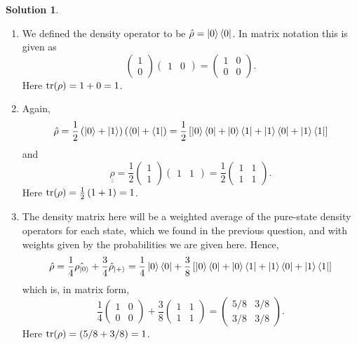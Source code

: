 \documentclass[10pt]{article}
\theoremstyle{definition}
\newtheorem{soln}{Solution}
\newcommand{\dul}[1]{\underline{\underline{#1}}}
\begin{document}
\begin{soln}~
  \begin{enumerate}[label=(\alph*)]
    \item We defined the density operator to be $\hat{\rho}=\ket{0}\bra{0}$. In matrix notation this is given as
          $$\begin{pmatrix}
              1 \\0
            \end{pmatrix}\begin{pmatrix}
              1 & 0
            \end{pmatrix}=\begin{pmatrix}
              1 & 0 \\
              0 & 0
            \end{pmatrix}.$$
          Here $\tr(\rho)=1+0=1$.
    \item Again,
          $$\hat{\rho}=\frac{1}{2}\left(\ket{0}+\ket{1}\right)\left(\bra{0}+\bra{1}\right)
            =\frac{1}{2}\left[\ket{0}\bra{0}+\ket{0}\bra{1}+\ket{1}\bra{0}+\ket{1}\bra{1}\right]
          $$ and
          $$
            \dul{\rho}=\frac{1}{2}\begin{pmatrix}
              1 \\1
            \end{pmatrix}\begin{pmatrix}
              1 & 1
            \end{pmatrix}
            =\frac{1}{2}\begin{pmatrix}
              1 & 1 \\
              1 & 1
            \end{pmatrix}.
          $$
          Here $\tr(\rho)=\frac{1}{2}\left(1+1\right)=1$.
    \item The density matrix here will be a weighted average of the pure-state density operators for each state, which we found in the previous question, and with
          weights given by the probabilities we are given here. Hence,
          $$\hat{\rho}=\frac{1}{4}\hat{\rho_{\ket{0}}}+\frac{3}{4}\hat{\rho}_{\ket{+}}
            =\frac{1}{4}\ket{0}\bra{0}+\frac{3}{8}\left[\ket{0}\bra{0}+\ket{0}\bra{1}+\ket{1}\bra{0}+\ket{1}\bra{1}\right]
          $$
          which is, in matrix form,
          $$\frac{1}{4}\begin{pmatrix}
              1 & 0 \\
              0 & 0
            \end{pmatrix}+\frac{3}{8}\begin{pmatrix}
              1 & 1 \\
              1 & 1
            \end{pmatrix}=\begin{pmatrix}
              5/8 & 3/8 \\
              3/8 & 3/8
            \end{pmatrix}.$$
          Here $\tr(\rho)=\left(5/8+3/8\right)=1$.
  \end{enumerate}
\end{soln}
\end{document}
